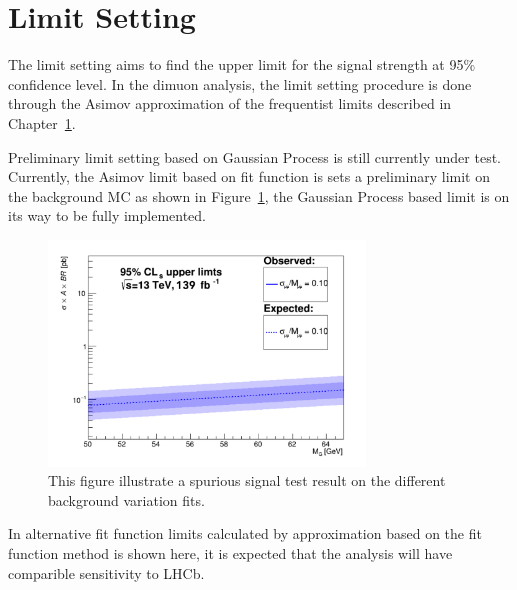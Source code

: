 \section{Limit Setting}
The limit setting aims to find the upper limit for the signal strength at 95\% confidence level. In the dimuon analysis, the limit setting procedure is done through the Asimov approximation of the frequentist limits described in Chapter~\ref{}.

Preliminary limit setting based on Gaussian Process is still currently under test. Currently, the Asimov limit based on fit function is sets a preliminary limit on the background MC as shown in Figure~\ref{}, the Gaussian Process based limit is on its way to be fully implemented. 

\begin{figure}[!htb]
   \begin{center}
       \includegraphics[width=0.75\textwidth]{figures/chapter_dimuon/limits}       
       \caption{
       This figure illustrate a spurious signal test result on the different background variation fits.
       }
    \label{fig:dimuonstudies}
   \end{center}
\end{figure}

In alternative fit function limits calculated by approximation based on the fit function method is shown here, it is expected that the analysis will have comparible sensitivity to LHCb. 

